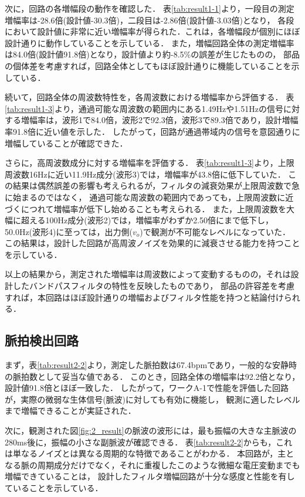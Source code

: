 次に，回路の各増幅段の動作を確認した．
表\ref{tab:result1-1}より，一段目の測定増幅率は-28.6倍(設計値-30.3倍)，二段目は-2.86倍(設計値-3.03倍)となり，
各段において設計値に非常に近い増幅率が得られた．これは，各増幅段が個別にほぼ設計通りに動作していることを示している．
また，増幅回路全体の測定増幅率は84.0倍(設計値91.8倍)となり，設計値より約-8.5\%の誤差が生じたものの，
部品の個体差を考慮すれば，回路全体としてもほぼ設計通りに機能していることを示している．

続いて，回路全体の周波数特性を，各周波数における増幅率から評価する．
表\ref{tab:result1-3}より，通過可能な周波数の範囲内にある1.49Hzや1.51Hzの信号に対する増幅率は，波形1で84.0倍，波形2で92.3倍，波形3で89.3倍であり，設計増幅率91.8倍に近い値を示した．
したがって，回路が通過帯域内の信号を意図通りに増幅していることが確認できた．

さらに，高周波数成分に対する増幅率を評価する．
表\ref{tab:result1-3}より，上限周波数16Hzに近い11.9Hz成分(波形3)では，増幅率が43.8倍に低下していた．
この結果は偶然誤差の影響も考えられるが，フィルタの減衰効果が上限周波数で急に始まるのではなく，
通過可能な周波数の範囲内であっても，上限周波数に近づくにつれて増幅率が低下し始めることも考えられる．
また，上限周波数を大幅に超える100Hz成分(波形2)では，増幅率がわずか2.50倍にまで低下し，50.0Hz(波形4)に至っては，出力側($v_o$)で観測が不可能なレベルになっていた．
この結果は，設計した回路が高周波ノイズを効果的に減衰させる能力を持つことを示している．

以上の結果から，測定された増幅率は周波数によって変動するものの，それは設計したバンドパスフィルタの特性を反映したものであり，
部品の許容差を考慮すれば，本回路はほぼ設計通りの増幅およびフィルタ性能を持つと結論付けられる．



\subsection{脈拍検出回路}
まず，表\ref{tab:result2-2}より，測定した脈拍数は67.4bpmであり，一般的な安静時の脈拍数として妥当な値である\cite{workA_脈拍数}．
このとき，回路全体の増幅率は92.2倍となり，設計値91.8倍とほぼ一致した．
したがって，ワークA-1で性能を評価した回路が，実際の微弱な生体信号(脈波)に対しても有効に機能し，
観測に適したレベルまで増幅できることが実証された．

次に，観測された図\ref{fig:2_result}の脈波の波形には，最も振幅の大きな主脈波の280ms後に，振幅の小さな副脈波が確認できる．
表\ref{tab:result2-2}からも，これは単なるノイズとは異なる周期的な特徴であることがわかる．
本回路が，主となる脈の周期成分だけでなく，それに重複したこのような微細な電圧変動までも増幅できていることは，
設計したフィルタ増幅回路が十分な感度と性能を有していることを示している．

